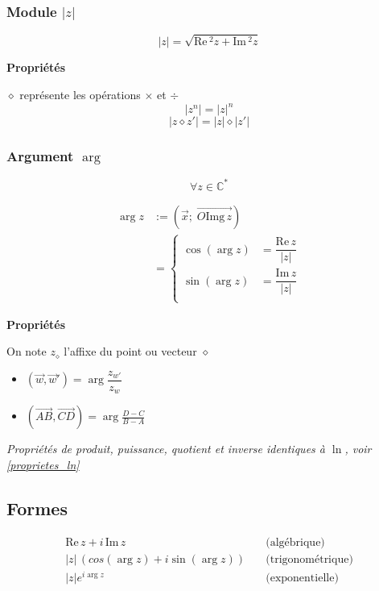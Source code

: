\documentclass{article}
\newcommand{\im}{\text{Im}\,}
\newcommand{\re}{\text{Re}\,}
\newcommand{\img}{\text{Img}\,}
\renewcommand{\C}{\mathds{C}}
\newcommand{\placeholder}{\diamond}
\newcommand{\vect}[1]{\overrightarrow{#1}}
\begin{document}
\subsubsection{Module $|z|$}

\[|z| = \sqrt{\re^2z + \im^2z}\]

\textbf{Propriétés}

$\placeholder$ représente les opérations $\times$ et $\div$
\[ |z^n| = |z|^n \]
\[ | z \placeholder z' | = |z|\placeholder|z'|\]


\subsubsection{Argument $\arg$}

\[\forall z \in \C^\ast\]

\begin{equation*}
    \begin{split}
        \arg z &:= \left( \vec x ;\; \vect{O \img z} \right) \\
            &= \begin{cases}
            \cos(\arg z) &= \dfrac{\re z}{|z|} \\
            \sin(\arg z) &= \dfrac{\im z}{|z|} \\
            \end{cases}
    \end{split}
\end{equation*}

\textbf{Propriétés}

On note $z_\placeholder$ l'affixe du point ou vecteur $\placeholder$

\begin{itemize}
    \item $(\vec w, \vect w') = \arg{\dfrac{z_{w'}}{z_w}}$
    \item $(\vect{AB}, \vect{CD}) = \arg{\frac{D-C}{B-A}}$
\end{itemize}

\textit{Propriétés de produit, puissance, quotient et inverse identiques à $\ln$, voir \ref{proprietes_ln}}


\subsection{Formes}

\begin{equation*}
    \begin{split}
        \re z + i\,\im z&\quad\text{(algébrique)} \\
          |z|\,(cos(\arg z) + i \sin(\arg z) )&\quad\text{(trigonométrique)} \\
          |z|e^{i\arg z}&\quad\text{(exponentielle)}
    \end{split}
\end{equation*}
\end{document}
